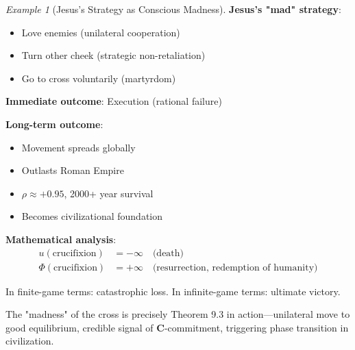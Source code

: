 \documentclass[11pt,a4paper]{article}
\theoremstyle{definition}
\theoremstyle{remark}
\newtheorem{example}{Example}[section]
\begin{document}
\begin{small}
\begin{enumerate}
\begin{example}[Jesus's Strategy as Conscious Madness]
\textbf{Jesus's "mad" strategy}:
\begin{itemize}
    \item Love enemies (unilateral cooperation)
    \item Turn other cheek (strategic non-retaliation)
    \item Go to cross voluntarily (martyrdom)
\end{itemize}

\textbf{Immediate outcome}: Execution (rational failure)

\textbf{Long-term outcome}: 
\begin{itemize}
    \item Movement spreads globally
    \item Outlasts Roman Empire
    \item \(\rho \approx +0.95\), 2000+ year survival
    \item Becomes civilizational foundation
\end{itemize}

\textbf{Mathematical analysis}:
\begin{align}
u(\text{crucifixion}) &= -\infty \quad \text{(death)} \\
\Phi(\text{crucifixion}) &= +\infty \quad \text{(resurrection, redemption of humanity)}
\end{align}

In finite-game terms: catastrophic loss.
In infinite-game terms: ultimate victory.

The "madness" of the cross is precisely Theorem 9.3 in action—unilateral move to good equilibrium, credible signal of \(\mathbf{C}\)-commitment, triggering phase transition in civilization.
\end{example}

\begin{figure}[H]
\centering
{}
\end{figure}
\end{enumerate}
\end{small}
\end{document}
